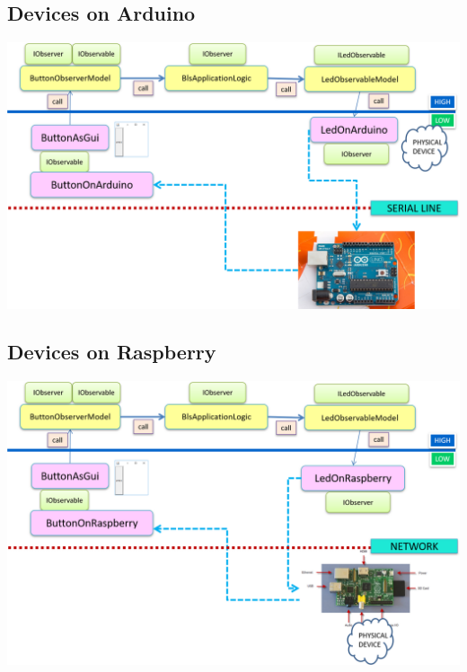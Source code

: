 \documentclass[10pt,a4paper,openright,twoside]{../llncs}
\begin{document}
\subsection{Devices on Arduino}

\medskip 
\includegraphics[scale = 0.5]{img/bls18/bls18Obj2Arduino.png}


\subsection{Devices on Raspberry}

\medskip 
\includegraphics[scale = 0.5]{img/bls18/bls18Obj2Rasp.png}

\end{document}
